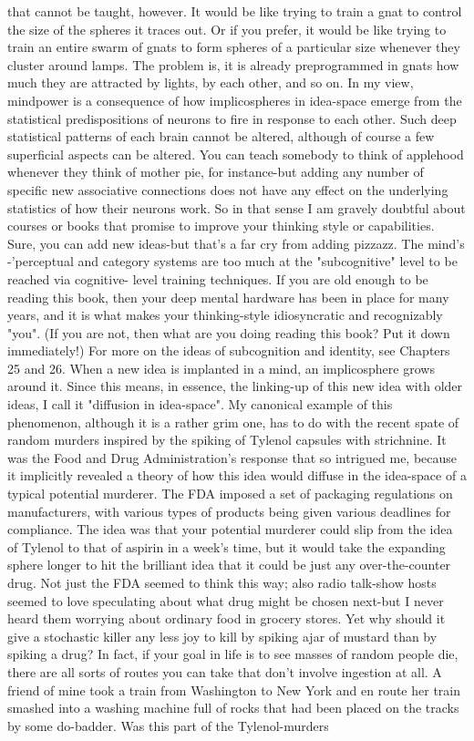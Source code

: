 that cannot be taught, however. It would be like trying to train a gnat to control the
size of the spheres it traces out. Or if you prefer, it would be like trying to train an
entire swarm of gnats to form spheres of a particular size whenever they cluster
around lamps. The problem is, it is already preprogrammed in gnats how much they
are attracted by lights, by each other, and so on.
        In my view, mindpower is a consequence of how implicospheres in idea-space
emerge from the statistical predispositions of neurons to fire in response to each other.
Such deep statistical patterns of each brain cannot be altered, although of course a few
superficial aspects can be altered. You can teach somebody to think of applehood
whenever they think of mother pie, for instance-but adding any number of specific
new associative connections does not have any effect on the underlying statistics of
how their neurons work. So in that sense I am gravely doubtful about courses or
books that promise to improve your thinking style or capabilities. Sure, you can add
new ideas-but that's a far cry from adding pizzazz. The mind's -'perceptual and
category systems are too much at the "subcognitive" level to be reached via cognitive-
level training techniques. If you are old enough to be reading this book, then your
deep mental hardware has been in place for many years, and it is what makes your
thinking-style idiosyncratic and recognizably "you". (If you are not, then what are you
doing reading this book? Put it down immediately!) For more on the ideas of
subcognition and identity, see Chapters 25 and 26.
        When a new idea is implanted in a mind, an implicosphere grows around it.
Since this means, in essence, the linking-up of this new idea with older ideas, I call it
"diffusion in idea-space". My canonical example of this phenomenon, although it is a
rather grim one, has to do with the recent spate of random murders inspired by the
spiking of Tylenol capsules with strichnine. It was the Food and Drug
Administration's response that so intrigued me, because it implicitly revealed a theory
of how this idea would diffuse in the idea-space of a typical potential murderer. The
FDA imposed a set of packaging regulations on manufacturers, with various types of
products being given various deadlines for compliance. The idea was that your
potential murderer could slip from the idea of Tylenol to that of aspirin in a week's
time, but it would take the expanding sphere longer to hit the brilliant idea that it
could be just any over-the-counter drug. Not just the FDA seemed to think this way;
also radio talk-show hosts seemed to love speculating about what drug might be
chosen next-but I never heard them worrying about ordinary food in grocery stores.
Yet why should it give a stochastic killer any less joy to kill by spiking ajar of
mustard than by spiking a drug? In fact, if your goal in life is to see masses of random
people die, there are all sorts of routes you can take that don't involve ingestion at all.
A friend of mine took a train from Washington to New York and en route her train
smashed into a washing machine full of rocks that had been placed on the tracks by
some do-badder. Was this part of the Tylenol-murders




